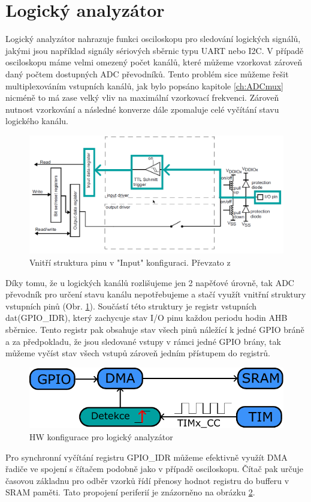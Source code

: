 \newpage
\section{Logický analyzátor}
Logický analyzátor nahrazuje funkci osciloskopu pro sledování logických signálů, jakými jsou například signály sériových sběrnic typu UART nebo I2C. V případě osciloskopu máme velmi omezený počet kanálů, které můžeme vzorkovat zároveň daný počtem dostupných ADC převodníků. Tento problém sice můžeme řešit multiplexováním vstupních kanálů, jak bylo popsáno kapitole \ref{ch:ADCmux} nicméně to má zase velký vliv na maximální vzorkovací frekvenci. Zároveň nutnost vzorkování a následné konverze dále zpomaluje celé vyčítání stavu logického kanálu.\\
\begin{figure}[H]
	\centering
	\includegraphics[width=0.8\linewidth]{Figs/Diagrams/SVG/InputPin.pdf}
	\caption{Vnitří struktura pinu v "Input" konfiguraci. Převzato z \cite{refG4}}
	\label{fig:GpioINPUT}
\end{figure}
Díky tomu, že u logických kanálů rozlišujeme jen 2 napěťové úrovně, tak ADC převodník pro určení stavu kanálu nepotřebujeme a stačí využít vnitřní struktury vstupních pinů (Obr. \ref{fig:GpioINPUT}). Součástí této struktury je registr vstupních dat(GPIO\_IDR), který zachycuje stav I/O pinu každou periodu hodin AHB sběrnice. Tento registr pak obsahuje stav všech pinů náležící k jedné GPIO bráně a za předpokladu, že jsou sledované vstupy v rámci jedné GPIO brány, tak můžeme vyčíst stav všech vstupů zároveň jedním přístupem do registrů.

\begin{figure}[H]
	\centering
	\includegraphics[width=0.6\linewidth]{Figs/Diagrams/SVG/LogicAnalyzer.pdf}
	\caption{HW konfigurace pro logický analyzátor}
	\label{fig:LogicAnalyzerHW}
\end{figure}
 Pro synchronní vyčítání registru GPIO\_IDR můžeme efektivně využít DMA řadiče ve spojení s čítačem podobně jako v případě osciloskopu. Čítač pak určuje časovou základnu pro odběr vzorků řídí přenosy hodnot registru do bufferu v SRAM paměti. Tato propojení periferií je znázorněno na obrázku \ref{fig:LogicAnalyzerHW}. 

